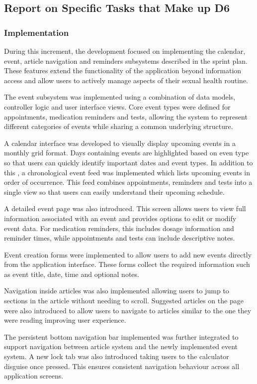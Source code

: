 \documentclass[a4paper,12pt]{article}
\begin{document}
\subsection{Report on Specific Tasks that Make up D6}
\subsubsection{Implementation}

During this increment, the development focused on implementing the calendar, event, article navigation and reminders subsystems described in the sprint plan. These features extend the functionality of the application beyond information access and allow users to actively manage aspects of their sexual health routine.

The event subsystem was implemented using a combination of data models, controller logic and user interface views. Core event types were defined for appointments, medication reminders and tests, allowing the system to represent different categories of events while sharing a common underlying structure.

A calendar interface was developed to visually display upcoming events in a monthly grid format. Days containing events are highlighted based on even type so that users can quickly identify important dates and event types. In addition to this , a chronological event feed was implemented which lists upcoming events in order of occurrence. This feed combines appointments, reminders and tests into a single view so that users can easily understand their upcoming schedule.

A detailed event page was also introduced. This screen allows users to view full information associated with an event and provides options to edit or modify event data. For medication reminders, this includes dosage information and reminder times,  while appointments and tests can include descriptive notes.

Event creation forms were implemented to allow users to add new events directly from the application interface. These forms collect the required information such as event title, date, time and optional notes.

Navigation inside articles was also implemented allowing users to jump to sections in the article without needing to scroll. Suggested articles on the page were also introduced to allow users to navigate to articles similar to the one they were reading improving user experience.

The persistent bottom navigation bar implemented was further integrated to support navigation between article system and the newly implemented event system. A new lock tab was also introduced taking users to the calculator disguise once pressed. This ensures consistent navigation behaviour across all application screens.
\end{document}
